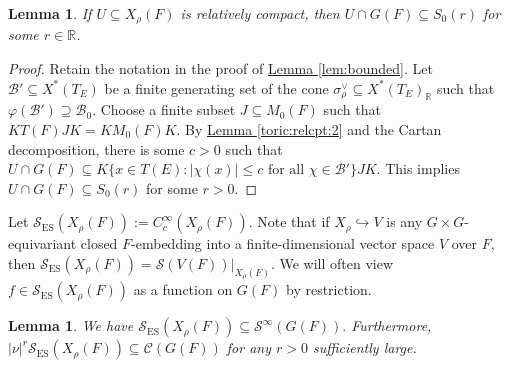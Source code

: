 \documentclass[10pt]{amsart}
\newtheorem{lemma}[theorem]{Lemma}
\theoremstyle{definition}
\numberwithin{equation}{section}
\numberwithin{equation}{subsection}
\newcommand{\RR}{\mathbb{R}}
\begin{document}
\begin{lemma}\label{lem:bounded:2} If $U\subseteq X_\rho(F)$ is relatively compact, then $U\cap G(F)\subseteq S_0(r)$ for some $r\in\RR$. 
\end{lemma}
\begin{proof} Retain the notation in the proof of \hyperref[lem:bounded]{Lemma \ref{lem:bounded}}. Let $\mathcal{B}'\subseteq X^*(T_E)$ be a finite generating set of the cone $\sigma_{\rho}^\vee\subseteq X^*(T_E)_\RR$ such that $\varphi(\mathcal{B}') \supseteq \mathcal{B}_0$. Choose a finite subset $J\subseteq M_0(F)$ such that $KT(F)JK=KM_0(F)K$. By \hyperref[toric:relcpt:2]{Lemma \ref{toric:relcpt:2}} and the Cartan decomposition, there is some $c>0$ such that $U\cap G(F)\subseteq K\{x\in T(E) : |\chi(x)|\leq c\text{ for all }\chi\in \mathcal{B}'\}JK$. This implies $U\cap G(F) \subseteq S_0(r)$ for some $r>0$.
\end{proof}

Let $\mathcal{S}_{\mathrm{ES}}(X_\rho(F)) := C_c^\infty(X_\rho(F))$. Note that if $X_\rho\hookrightarrow V$ is any $G\times G$-equivariant closed $F$-embedding into a finite-dimensional vector space $V$ over $F$, then $\mathcal{S}_{\mathrm{ES}}(X_\rho(F))=\mathcal{S}(V(F))|_{X_\rho(F)}.$ We will often view $f\in \mathcal{S}_{\mathrm{ES}}(X_\rho(F))$ as a function on $G(F)$ by restriction.



\begin{lemma}\label{SESinSinfty}
    We have $\mathcal{S}_{\mathrm{ES}}(X_\rho(F))\subseteq \mathcal{S}^\infty(G(F)).$ Furthermore,  $|\nu|^r\mathcal{S}_{\mathrm{ES}}(X_\rho(F))\subseteq  \mathcal{C}(G(F))$ for any $r>0$ sufficiently large.
\end{lemma}
\end{document}
